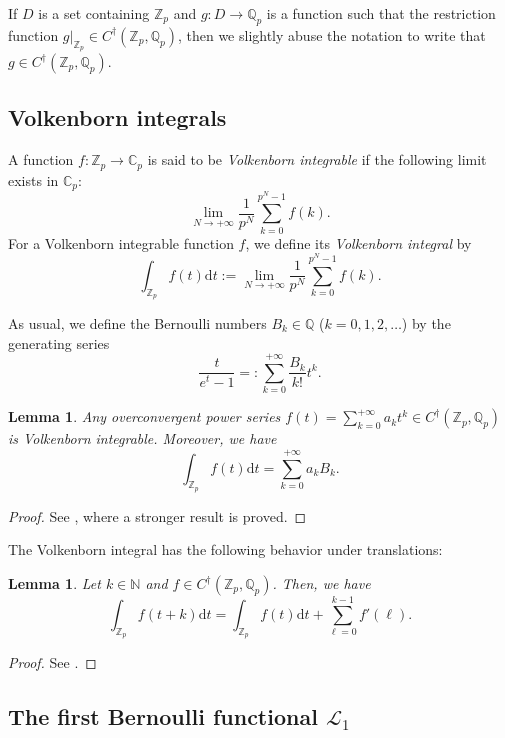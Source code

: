 \documentclass[12pt]{article}
\newtheorem{lemma}[theorem]{Lemma}
\numberwithin{equation}{section}
\begin{document}
If $D$ is a set containing $\mathbb{Z}_p$ and $g: D \longrightarrow \mathbb{Q}_p$ is a function such that the restriction function $g|_{\mathbb{Z}_p} \in C^{\dagger}(\mathbb{Z}_p,\mathbb{Q}_p)$, then we slightly abuse the notation to write that $g \in C^{\dagger}(\mathbb{Z}_p,\mathbb{Q}_p)$.

\subsection{Volkenborn integrals}
A function $f: \mathbb{Z}_p \longrightarrow \mathbb{C}_p$ is said to be \emph{Volkenborn integrable} if the following limit exists in $\mathbb{C}_p$:
\[ \lim_{N \to +\infty} \frac{1}{p^N}\sum_{k=0}^{p^{N}-1} f(k).  \]
For a Volkenborn integrable function $f$, we define its \emph{Volkenborn integral} by 
\[ \int_{\mathbb{Z}_p}f(t) \mathrm{d}t:= \lim_{N \to +\infty} \frac{1}{p^N}\sum_{k=0}^{p^{N}-1} f(k). \]

As usual, we define the Bernoulli numbers $B_k \in \mathbb{Q}$ ($k=0,1,2,\ldots$) by the generating series
\[ \frac{t}{e^t-1} =: \sum_{k=0}^{+\infty} \frac{B_k}{k!}t^k. \]

\begin{lemma}\label{lem_Vol_t^k}
Any overconvergent power series $f(t) = \sum_{k=0}^{+\infty} a_k t^k \in C^{\dagger}(\mathbb{Z}_p,\mathbb{Q}_p)$ is Volkenborn integrable. Moreover, we have
\[ \int_{\mathbb{Z}_p}f(t) \mathrm{d}t = \sum_{k=0}^{+\infty} a_kB_k. \]
\end{lemma}

\begin{proof}
See \cite[Proposition, pp. 270]{Rob2000}, where a stronger result is proved.
\end{proof}

The Volkenborn integral has the following behavior under translations:
\begin{lemma}\label{lem_Vol_trans}
Let $k\in \mathbb{N}$ and $f \in C^{\dagger}(\mathbb{Z}_p,\mathbb{Q}_p)$. Then, we have
\[
\int_{\mathbb{Z}_p} f(t+k)\mathrm{d}t= \int_{\mathbb{Z}_p} f(t)\mathrm{d}t+\sum_{\ell=0}^{k-1}f'(\ell).
\]
\end{lemma}

\begin{proof}
See \cite[Proposition 2, pp. 265]{Rob2000}.
\end{proof}


\subsection{The first Bernoulli functional $\mathcal{L}_1$}
\end{document}
